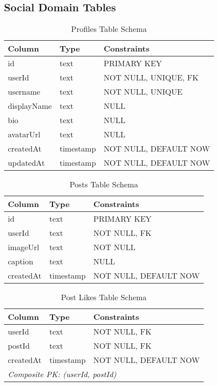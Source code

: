 \documentclass[12pt,a4paper]{report}
\begin{document}
\subsection{Social Domain Tables}

\begin{table}[H]
\centering
\caption{Profiles Table Schema}
\begin{tabular}{@{}lll@{}}
\toprule
\textbf{Column} & \textbf{Type} & \textbf{Constraints} \\ \midrule
id & text & PRIMARY KEY \\
userId & text & NOT NULL, UNIQUE, FK \\
username & text & NOT NULL, UNIQUE \\
displayName & text & NULL \\
bio & text & NULL \\
avatarUrl & text & NULL \\
createdAt & timestamp & NOT NULL, DEFAULT NOW \\
updatedAt & timestamp & NOT NULL, DEFAULT NOW \\ \bottomrule
\end{tabular}
\end{table}

\begin{table}[H]
\centering
\caption{Posts Table Schema}
\begin{tabular}{@{}lll@{}}
\toprule
\textbf{Column} & \textbf{Type} & \textbf{Constraints} \\ \midrule
id & text & PRIMARY KEY \\
userId & text & NOT NULL, FK \\
imageUrl & text & NOT NULL \\
caption & text & NULL \\
createdAt & timestamp & NOT NULL, DEFAULT NOW \\ \bottomrule
\end{tabular}
\end{table}

\begin{table}[H]
\centering
\caption{Post Likes Table Schema}
\begin{tabular}{@{}lll@{}}
\toprule
\textbf{Column} & \textbf{Type} & \textbf{Constraints} \\ \midrule
userId & text & NOT NULL, FK \\
postId & text & NOT NULL, FK \\
createdAt & timestamp & NOT NULL, DEFAULT NOW \\
\multicolumn{3}{l}{\textit{Composite PK: (userId, postId)}} \\ \bottomrule
\end{tabular}
\end{table}
\end{document}
